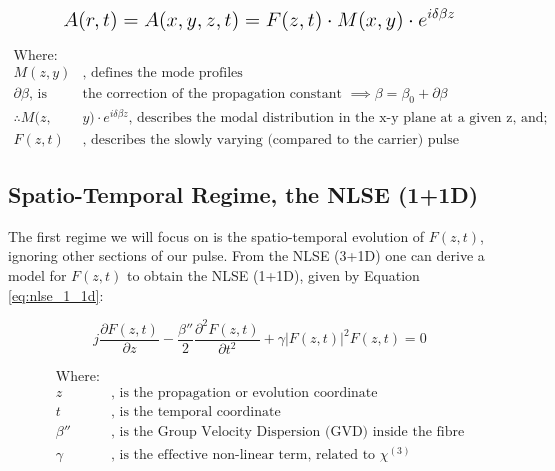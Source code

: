 \documentclass[colorlinks,11pt,a4paper,normalphoto,withhyper,ragged2e]{altareport}
\begin{document}
	\begin{equation} \label{eq:sep_of_vars_envelope}
		\mathlarger{ \mathlarger{ A(r,t) = A(x, y, z, t) = F(z, t) \cdot M(x, y) \cdot e^{i \delta \beta z} } }
	\end{equation}
	
	\begin{align*}
		\text{Where:}& \\
		M(z, y) & \text{, defines the mode profiles} \\
		\partial \beta \text{, is } & \text{the correction of the propagation constant } \implies \beta = \beta_0 + \partial \beta \\
		\therefore M(z, &y) \cdot e^{i \delta \beta z} \text{, describes the modal distribution in the x-y plane at a given z, and;} \\
		F(z, t) & \text{, describes the slowly varying (compared to the carrier) pulse envelope in the z-t plane}
	\end{align*}
	
	\pagebreak
	
	
	
	
	\subsection{Spatio-Temporal Regime, the NLSE (1+1D)}
	
	The first regime we will focus on is the spatio-temporal evolution of $F(z,t)$, ignoring other sections of our pulse. From the NLSE (3+1D) one can derive a model for $F(z,t)$ to obtain the NLSE (1+1D), given by Equation \ref{eq:nlse_1_1d}: \linebreak
	
	\begin{equation} \label{eq:nlse_1_1d}
       j \frac{\partial F(z,t)}{\partial z} - \frac{ \beta ''}{2} \frac{\partial^2 F(z,t)}{\partial t^2} + \gamma |F(z,t)|^2 F(z,t) = 0
	\end{equation}
	
	\begin{align}
		\text{Where:}& \nonumber\\
		z & \text{, is the propagation or evolution coordinate} \nonumber\\
		t & \text{, is the temporal coordinate} \nonumber\\
		\beta '' & \text{, is the Group Velocity Dispersion (GVD) inside the fibre} \nonumber\\
		\gamma & \text{, is the effective non-linear term, related to } \chi^{(3)} \nonumber
	\end{align}
	
\end{document}
